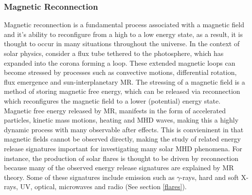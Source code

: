 \subsubsection{Magnetic Reconnection}\label{MR}
Magnetic reconnection is a fundamental process associated with a magnetic field and it's ability to reconfigure from a high to a low energy state, as a result, it is thought to occur in many situations throughout the universe. In the context of solar physics, consider a flux tube tethered to the photosphere, which has expanded into the corona forming a loop. These extended magnetic loops can become stressed by processes such as convective motions, differential rotation, flux emergence and sun-interplanetary MR. The stressing of a magnetic field is a method of storing magnetic free energy, which can be released via reconnection which reconfigures the magnetic field to a lower (potential) energy state. Magnetic free energy released by MR, manifests in the form of accelerated particles, kinetic mass motions, heating and MHD waves, making this a highly dynamic process with many observable after effects. This is convieninent in that magnetic fields cannot be observed directly, making the study of related energy release signatures important for investigating many solar MHD phenomena. For instance, the production of solar flares is thought to be driven by reconnection because many of the observed energy release signatures are explained by MR theory. Some of these signatures include emission such as $\gamma$-rays, hard and soft X-rays, UV, optical, microwaves and radio (See section \ref{flares}).

